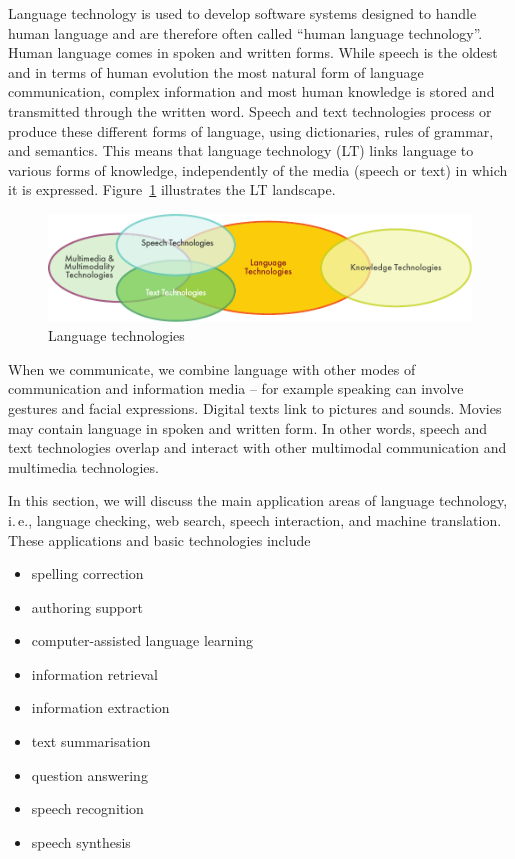 \clearpage


\begin{multicols}{2}
Language technology is used to develop software systems designed to handle human language and are therefore often called “human language technology”. Human language comes in spoken and written forms. While speech is the oldest and in terms of human evolution the most natural form of language communication, complex information and most human knowledge is stored and transmitted through the written word. Speech and text technologies process or produce these different forms of language, using dictionaries, rules of grammar, and semantics. This means that language technology (LT) links language to various forms of knowledge, independently of the media (speech or text) in which it is expressed. Figure~\ref{fig:ltincontext_en} illustrates the LT landscape.

\begin{figure}[htb]
  \center
  \includegraphics[width=\textwidth]{../_media/english/language_technologies}
  \caption{Language technologies}
  \label{fig:ltincontext_en}
\end{figure}

When we communicate, we combine language with other modes of
communication and information media – for example speaking can involve
gestures and facial expressions. Digital texts link to pictures and
sounds. Movies may contain language in spoken and written form. In
other words, speech and text technologies overlap and interact with
other multimodal communication and multimedia technologies.
 
In this section, we will discuss the main application areas of
language technology, i.\,e., language checking, web search, speech
interaction, and machine translation. These applications and basic
technologies include

\begin{itemize}
\item spelling correction
\item authoring support
\item computer-assisted language learning
\item information retrieval 
\item information extraction
\item text summarisation
\item question answering
\item speech recognition 
\item speech synthesis 
\end{itemize}


\end{multicols}

